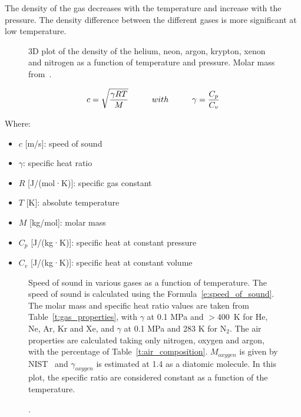 \documentclass[../main]{subfiles}
\begin{document}
The density of the gas decreases with the temperature and increase with the pressure. The density difference between the different gases is more significant at low temperature.

\vspace{0mm}
\begin{figure}[H]
    \centering
        
        \caption{3D plot of the density of the helium, neon, argon, krypton, xenon and nitrogen as a function of temperature and pressure. Molar mass from~\cite{Tournier2008PropertiesHelium}.}
        \label{}
\end{figure}
\FloatBarrier
\vspace{0mm}

\vspace{0mm}
\begin{equation}
    c = \sqrt{\frac{\gamma R T}{M}}
    \hspace{10 mm}
    with
    \hspace{10 mm}
    \gamma = \frac{C_{p}}{C_{v}}
    \label{e:speed_of_sound}
\end{equation}
\vspace{0mm}

\begin{minipage}{\linewidth}
Where:
\begin{itemize}
    \item[] $c$ [m/s]: speed of sound 
    \item[] $\gamma$: specific heat ratio
    \item[] $R$ [J/(mol·K)]: specific gas constant 
    \item[] $T$ [K]: absolute temperature 
    \item[] $M$ [kg/mol]: molar mass 
    \item[] $C_p$ [J/(kg·K)]: specific heat at constant pressure 
    \item[] $C_v$ [J/(kg·K)]: specific heat at constant volume
\end{itemize}
\end{minipage}



\vspace{0mm}
\begin{figure}[H]
    \centering
        
        \caption[Speed of sound in various gases as a function of temperature]. {Speed of sound in various gases as a function of temperature. The speed of sound is calculated using the Formula~\ref{e:speed_of_sound}. The molar mass and specific heat ratio values are taken from Table~\ref{t:gas_properties}, with $\gamma$ at 0.1 MPa and $>$400~K for He, Ne, Ar, Kr and Xe, and $\gamma$ at 0.1 MPa and 283 K for N$_2$. The air properties are calculated taking only nitrogen, oxygen and argon, with the percentage of Table~\ref{t:air_composition}. $M_{oxygen}$ is given by NIST~\cite{Chase1998NISTJANAFThemochemical} and $\gamma_{oxygen}$ is estimated at 1.4 as a diatomic molecule. In this plot, the specific ratio are considered constant as a function of the temperature.}
        \label{f:speed_of_sound}
\end{figure}
\FloatBarrier
\vspace{0mm}
\end{document}
